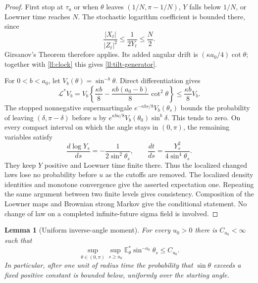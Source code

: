 \documentclass[11pt]{article}
\newtheorem{lemma}[theorem]{Lemma}
\theoremstyle{definition}
\theoremstyle{remark}
\numberwithin{equation}{section}
\begin{document}
\begin{proof}
First stop at $\tau_u$ or when $\theta$ leaves $(1/N,\pi-1/N)$,
$Y$ falls below $1/N$, or Loewner time reaches $N$.  The stochastic
logarithm coefficient is bounded there, since
\[
 \frac{|X_t|}{|Z_t|^2}\le\frac1{2Y_t}\le\frac N2.
\]
Girsanov's Theorem therefore applies. Its added
angular drift is $(\kappa a_0/4)\cot\theta$; together with
\eqref{ll:clock} this gives \eqref{ll:tilt-generator}.

For $0<b<a_0$, let $V_b(\theta)=\sin^{-b}\theta$. Direct
differentiation gives
\begin{equation}
 \mathcal L^*V_b
 =V_b\left\{\frac{\kappa b}{8}
          -\frac{\kappa b(a_0-b)}8\cot^2\theta\right\}
 \le\frac{\kappa b}{8}V_b.
 \label{ll:lyapunov}
\end{equation}
The stopped nonnegative supermartingale
$e^{-\kappa bs/8}V_b(\theta_s)$ bounds the probability of leaving
$(\delta,\pi-\delta)$ before $u$ by
$e^{\kappa bu/8}V_b(\theta_0)\sin^b\delta$.
This tends to zero. On every compact interval on which the angle
stays in $(0,\pi)$, the remaining variables satisfy
\begin{equation}
 \frac{d\log Y_s}{ds}=-\frac1{2\sin^2\theta_s},
 \qquad
 \frac{dt}{ds}=\frac{Y_s^2}{4\sin^4\theta_s}.
 \label{ll:physical-clock}
\end{equation}
They keep $Y$ positive and Loewner time finite there. Thus the
localized changed laws lose no probability before $u$ as the
cutoffs are removed. The localized density identities and monotone
convergence give the asserted expectation one. Repeating the same
argument between two finite levels gives consistency. Composition
of the Loewner maps and Brownian strong Markov give the conditional
statement. No change of law on a completed infinite-future sigma
field is involved.
\end{proof}

\begin{lemma}[Uniform inverse-angle moment]\label{ll:inverse-angle}
For every $u_0>0$ there is $C_{u_0}<\infty$ such that
\[
 \sup_{\theta\in(0,\pi)}\sup_{s\ge u_0}
 \mathbb E^*_{\theta}\sin^{-a_0}\theta_s\le C_{u_0}.
\]
In particular, after one unit of radius time the probability that
$\sin\theta$ exceeds a fixed positive constant is bounded below,
uniformly over the starting angle.
\end{lemma}
\end{document}

